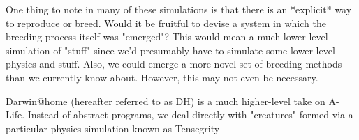 \documentclass{article}
\begin{document}
One thing to note in many of these simulations is that there is an *explicit* way to reproduce or breed. Would it be fruitful to devise a system in which the breeding process itself was "emerged"? This would mean a much lower-level simulation of "stuff" since we'd presumably have to simulate some lower level physics and stuff. Also, we could emerge a more novel set of breeding methods than we currently know about. However, this may not even be necessary.

Darwin@home (hereafter referred to as DH) is a much higher-level take on A-Life. Instead of abstract programs, we deal directly with "creatures" formed via a particular physics simulation known as Tensegrity






 

\end{document}
